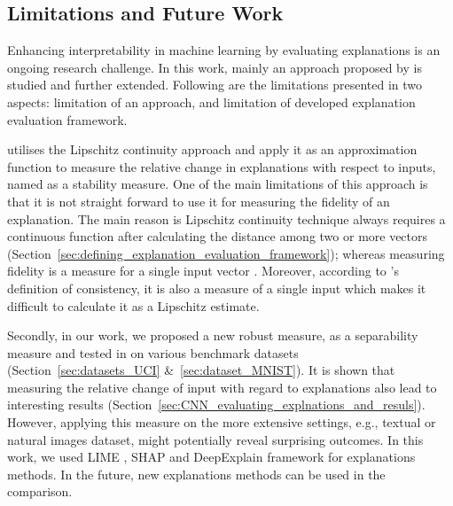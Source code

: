 \documentclass[english]{tktltiki2}
\theoremstyle{definition}
\theoremstyle{remark}
\begin{document}
\subsection{Limitations and Future Work} %
Enhancing interpretability in machine learning by evaluating explanations is an ongoing research challenge. In this work, mainly an approach proposed by \citet{alvarez2018robustness} is studied and further extended. Following are the limitations presented in two aspects: limitation of an approach, and limitation of developed explanation evaluation framework. 

\citet{alvarez2018robustness} utilises the Lipschitz continuity approach and apply it as an approximation function to measure the relative change in explanations with respect to inputs, named as a stability measure. One of the main limitations of this approach is that it is not straight forward to use it for measuring the fidelity of an explanation. The main reason is Lipschitz continuity technique always requires a continuous function after calculating the distance among two or more vectors (Section~\ref{sec:defining_explanation_evaluation_framework}); whereas measuring fidelity is a measure for a single input vector \citep{molnarinterpretable}. Moreover, according to \citet{molnarinterpretable}’s definition of consistency, it is also a measure of a single input which makes it difficult to calculate it as a Lipschitz estimate.

Secondly, in our work, we proposed a new robust measure, as a separability measure and tested in on various benchmark datasets (Section~\ref{sec:datasets_UCI} \&~\ref{sec:dataset_MNIST}). 
It is shown that measuring the relative change of input with regard to explanations also lead to interesting results (Section~\ref{sec:CNN_evaluating_explnations_and_resuls}). However, applying this measure on the more extensive settings, e.g., textual or natural images dataset, might potentially reveal surprising outcomes. In this work, we used LIME \citep{ribeiro2016model}, SHAP \citep{lundberg2017unified} and DeepExplain framework \citep{ancona2017towards} for explanations methods. In the future, new explanations methods can be used in the comparison.
\end{document}
